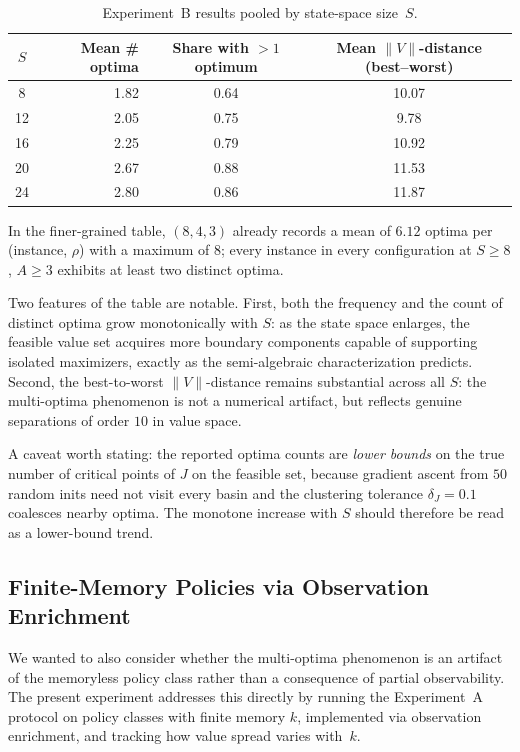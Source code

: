 \documentclass{article}
\theoremstyle{definition}
\theoremstyle{remark}
\begin{document}
\begin{table}[h]
  \caption{Experiment~B results pooled by state-space size~$S$.}
  \centering
  \renewcommand{\arraystretch}{1.2}
  \begin{tabular}{@{}crcc@{}}
    \toprule
    $S$ & Mean \# optima & Share with ${>}1$ optimum & Mean $\|V\|$-distance (best--worst) \\
    \midrule
     8 & 1.82 & 0.64 & 10.07 \\
    12 & 2.05 & 0.75 &  9.78 \\
    16 & 2.25 & 0.79 & 10.92 \\
    20 & 2.67 & 0.88 & 11.53 \\
    24 & 2.80 & 0.86 & 11.87 \\
    \bottomrule
  \end{tabular}
  \label{tab:expB}
\end{table}
 
In the finer-grained table, $(8, 4, 3)$ already records a mean of $6.12$ optima per (instance, $\rho$) with a maximum of $8$; every instance in every configuration at $S \geq 8$, $A \geq 3$ exhibits at least two distinct optima.
 
Two features of the table are notable. First, both the frequency and the count of distinct optima grow monotonically with $S$: as the state space enlarges, the feasible value set acquires more boundary components capable of supporting isolated maximizers, exactly as the semi-algebraic characterization predicts. Second, the best-to-worst $\|V\|$-distance remains substantial across all $S$: the multi-optima phenomenon is not a numerical artifact, but reflects genuine separations of order $10$ in value space.
 
A caveat worth stating: the reported optima counts are \emph{lower bounds} on the true number of critical points of $J$ on the feasible set, because gradient ascent from $50$ random inits need not visit every basin and the clustering tolerance $\delta_J = 0.1$ coalesces nearby optima. The monotone increase with $S$ should therefore be read as a lower-bound trend.
 
\subsection{Finite-Memory Policies via Observation Enrichment}
\label{app:experiment-C}
 
We wanted to also consider whether the multi-optima phenomenon is an artifact of the memoryless policy class rather than a consequence of partial observability. 
The present experiment addresses this directly by running the Experiment~A protocol on policy classes with finite memory $k$, implemented via observation enrichment, and tracking how value spread varies with~$k$.
 
\end{document}
